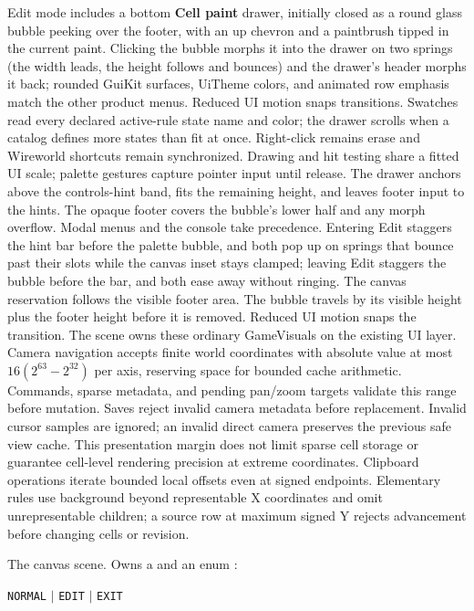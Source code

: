 Edit mode includes a bottom \textbf{Cell paint} drawer, initially closed as a
round glass bubble peeking over the footer, with an up chevron and a
paintbrush tipped in the current paint. Clicking the bubble morphs it into the
drawer on two springs (the width leads, the height follows and bounces) and
the drawer's header morphs it back; rounded GuiKit surfaces, UiTheme colors,
and animated row emphasis match the other product menus. Reduced UI motion snaps transitions.
Swatches read every declared active-rule state name and color; the drawer scrolls
when a catalog defines more states than fit at once. Right-click remains erase
and Wireworld shortcuts remain synchronized. Drawing and hit testing share a fitted UI scale;
palette gestures capture pointer input until release. The drawer anchors above the controls-hint band,
fits the remaining height, and leaves footer input to the hints. The opaque
footer covers the bubble's lower half and any morph overflow. Modal menus and the console
take precedence. Entering Edit staggers the hint bar before the palette bubble,
and both pop up on springs that bounce past their slots while the canvas inset
stays clamped;
leaving Edit staggers the bubble before the bar, and both ease away without
ringing. The canvas reservation follows the visible footer area. The bubble
travels by its visible height plus the footer
height before it is removed. Reduced UI motion snaps the transition. The scene owns these ordinary
GameVisuals on the existing UI layer.
Camera navigation accepts finite world coordinates with absolute value at most
$16(2^{63}-2^{32})$ per axis, reserving space for bounded cache arithmetic.
Commands, sparse metadata, and pending pan/zoom targets validate this range
before mutation. Saves reject invalid camera metadata before replacement.
Invalid cursor samples are ignored; an invalid direct camera preserves the
previous safe view cache. This presentation margin does not limit sparse cell
storage or guarantee cell-level rendering precision at extreme coordinates.
Clipboard operations iterate bounded local offsets even at signed endpoints.
Elementary rules use background beyond representable X coordinates and omit
unrepresentable children; a source row at maximum signed Y rejects advancement
before changing cells or revision.

The canvas scene. Owns a  and an enum
:
\begin{center}
\texttt{NORMAL} $\mid$ \texttt{EDIT} $\mid$ \texttt{EXIT}
\end{center}

